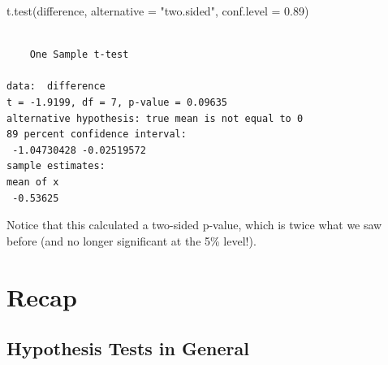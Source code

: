 \documentclass[
  letterpaper,
  DIV=11,
  numbers=noendperiod,
  oneside]{scrreprt}
\newenvironment{Shaded}{\begin{snugshade}}{\end{snugshade}}
\newcommand{\AttributeTok}[1]{\textcolor[rgb]{0.40,0.45,0.13}{#1}}
\newcommand{\FloatTok}[1]{\textcolor[rgb]{0.68,0.00,0.00}{#1}}
\newcommand{\FunctionTok}[1]{\textcolor[rgb]{0.28,0.35,0.67}{#1}}
\newcommand{\NormalTok}[1]{\textcolor[rgb]{0.00,0.23,0.31}{#1}}
\newcommand{\StringTok}[1]{\textcolor[rgb]{0.13,0.47,0.30}{#1}}
\begin{document}
\begin{Shaded}
\begin{Highlighting}[]
\FunctionTok{t.test}\NormalTok{(difference, }\AttributeTok{alternative =} \StringTok{"two.sided"}\NormalTok{, }\AttributeTok{conf.level =} \FloatTok{0.89}\NormalTok{)}
\end{Highlighting}
\end{Shaded}

\begin{verbatim}

    One Sample t-test

data:  difference
t = -1.9199, df = 7, p-value = 0.09635
alternative hypothesis: true mean is not equal to 0
89 percent confidence interval:
 -1.04730428 -0.02519572
sample estimates:
mean of x 
 -0.53625 
\end{verbatim}

Notice that this calculated a two-sided p-value, which is twice what we
saw before (and no longer significant at the 5\% level!).

\hypertarget{recap-1}{%
\section{Recap}\label{recap-1}}

\hypertarget{hypothesis-tests-in-general}{%
\subsection{Hypothesis Tests in
General}\label{hypothesis-tests-in-general}}
\end{document}
